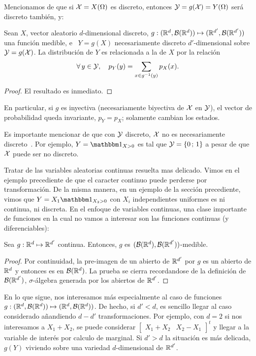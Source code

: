 Mencionamos  de que si  $\mathcal{X} =  X(\Omega)$ es  discreto, entonces  $\mathcal{Y} =  g(\mathcal{X}) =
Y(\Omega)$ ser\'a discreto tambi\'en, y:
%
\begin{teorema}
  Sean   $X$,   vector  aleatorio   $d$-dimensional   discreto,  $g:(\mathbb{R}^d   ,
  \mathcal{B}(\mathbb{R}^d)) \mapsto (\mathbb{R}^{d'} , \mathcal{B}(\mathbb{R}^{d'}))$ una funci\'on medible, e \
  $Y =  g(X)$ necesariamente discreto  $d'$-dimensional sobre $\mathcal{Y} =  g(\mathcal{X})$.  La
  distribuci\'on de $Y$ es relacionada a la de $X$ por la relaci\'on
  \[
  \forall \, y \in \mathcal{Y}, \quad p_Y(y) = \sum_{x \in g^{-1}(y)} p_X(x).
  \]
\end{teorema}
%
\begin{proof}
El resultado es inmediato.
\end{proof}
%
\noindent En particular,  si $g$ es inyectiva (necesariamente  biyectiva de $\mathcal{X}$
en $\mathcal{Y}$),  el vector  de probabilidad queda  invariante, $p_Y =  p_X$; solamente
cambian los estados.

Es  importante mencionar de  que con  $\mathcal{Y}$ discreto,  $\mathcal{X}$ no  es necesariamente
discreto~\cite{AthLah06}. Por ejemplo, $Y = \un_{X>0}$  es tal que $\mathcal{Y} = \{ 0 \,
; \, 1 \}$ a pesar de que $\mathcal{X}$ puede ser no discreto.

Tratar de las variables aleatorias  continuas resuelta mas delicado. Vimos en el
ejemplo   precediente  de   que  el   caracter  continuo   puede   perderse  por
transformaci\'on. De la misma manera, en un ejemplo de la secci\'on precediente,
vimos  que  $Y =  X_1  \un_{X_2>0}$ con  $X_i$  independientes  uniformes es  ni
continua,  ni  discreta.  En  el  enfoque  de  variables  continuas,  una  clase
importante  de funciones  en la  cual  no vamos  a interesar  son las  funciones
continuas (y diferenciables):
%
\begin{lema}
  Sea   $g:   \mathbb{R}^d   \mapsto   \mathbb{R}^{d'}$   continua.   Entonces,   $g$   es
  $(\mathcal{B}(\mathbb{R}^d),\mathcal{B}(\mathbb{R}^{d'}))$-medible.
\end{lema}
%
\begin{proof}
  Por continuidad,  la pre-imagen de  un abierto de  $\mathbb{R}^{d'}$ por $g$  es un
  abierto  de $\mathbb{R}^d$  y entonces  es en  $\mathcal{B}(\mathbb{R}^d)$. La  prueba  se cierra
  recordandose  de  la   definici\'on  de  $\mathcal{B}(\mathbb{R}^{d'})$,  $\sigma$-\'algebra
  generada por los abiertos de $\mathbb{R}^{d'}$.
\end{proof}

En lo  que sigue, nos interesamos  m\'as especialmente al caso  de funciones $g:
(\mathbb{R}^d ,  \mathcal{B}(\mathbb{R}^d)) \mapsto (\mathbb{R}^d ,  \mathcal{B}(\mathbb{R}^d))$.  De hecho,  si $d' <
d$,   es    sencillo   llegar   al   caso    considerado   a\~nandiendo   $d-d'$
transformaciones. Por ejemplo, con $d = 2$  si nos interesamos a $X_1 + X_2$, se
puede considerar $\begin{bmatrix} X_1 + X_2 & X_2 - X_1\end{bmatrix}^t$ y llegar
a la variable de  inter\'es por calculo de marginal. Si $d'  > d$ la situaci\'on
es  m\'as  delicada,  $g(Y)$  viviendo  sobre una  variedad  $d$-dimensional  de
$\mathbb{R}^{d'}$.

